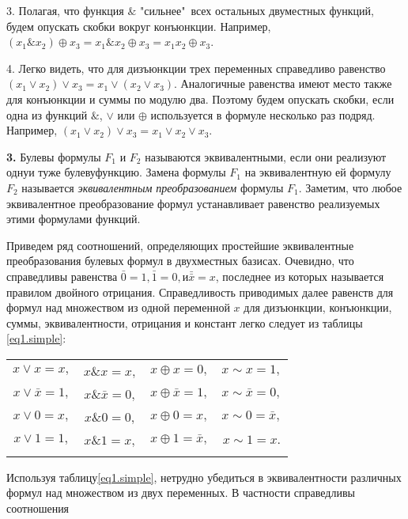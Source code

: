 \documentclass[a4paper, 12pt]{article}
\numberwithin{equation}{section}
\begin{document}
  3. Полагая, что функция $\&$  "сильнее"\ всех остальных двуместных функций, будем опускать скобки вокруг конъюнкции. Например,$ (x_{1}\& x_{2})\oplus x_{3} = x_{1}\& x_{2} \oplus x_{3} = x_{1}x_{2} \oplus x_{3}$.
   
  4. Легко видеть, что для дизъюнкции трех переменных справедливо равенство $ (x_{1} \vee x_{2}) \vee x_{3} = x_{1} \vee (x_{2} \vee x_{3})$.
  Аналогичные равенства имеют место также для конъюнкции и суммы по модулю два. Поэтому будем опускать скобки, если одна из функций $\&$, $ \vee $ или $ \oplus $ используется в формуле несколько раз подряд. Например, 
  $ (x_{1} \vee x_{2}) \vee x_{3} = x_{1} \vee x_{2} \vee x_{3} $.
  
  \textbf{3.} Булевы формулы $ F_{1} $ и $F_{2}$ называются эквивалентными, если они реализуют однуи туже булевуфункцию. Замена формулы $F_{1}$ на эквивалентную ей формулу $F_{2}$ называется \textit{эквивалентным преобразованием} формулы $F_{1}$. Заметим, что любое эквивалентное преобразование формул устанавливает равенство реализуемых этими формулами функций. 
  
  Приведем ряд соотношений, определяющих простейшие эквивалентные преобразования булевых формул в двухместных базисах. Очевидно, что справедливы равенства $\bar{0}=1, \bar{1}=0, и \bar{\bar{x}} = x$, последнее из которых называется правилом двойного отрицания. Справедливость приводимых далее равенств для формул над множеством из одной переменной $x$ для дизъюнкции, конъюнкции, суммы, эквивалентности, отрицания и констант легко следует из таблицы \eqref{eq1.simple}:

  \begin{center}
  	\begin{tabular}{cccc}
  	    $x \vee x = x,   $ & $ x $\&$ x = x,  $ & $  x \oplus x = 0,  $ &   $ x \sim x = 1,  $ \\
  	    $ x \vee \bar{x} = 1,  $ & $ x$\&$\bar{x} = 0,  $ &  $ x \oplus \bar{x} = 1,  $ &   $x \sim \bar{x} = 0,   $ \\
  	    $x \vee 0 = x,   $ & $x $\&$ 0 = 0,   $ &  $x \oplus 0 = x,   $ & $ x \sim 0 = \bar{x},  $ \\
        $ x \vee 1= 1,  $  & $ x $\&$ 1 = x,  $ &  $ x \oplus 1 = \bar{x},  $ &  $ x \sim 1 = x. $  \\ 
        \label{eq1.simple}
  	\end{tabular}
  \end{center}

Используя таблицу\eqref{eq1.simple}, нетрудно убедиться в эквивалентности различных формул над множеством из двух переменных. В частности справедливы соотношения
\end{document}
